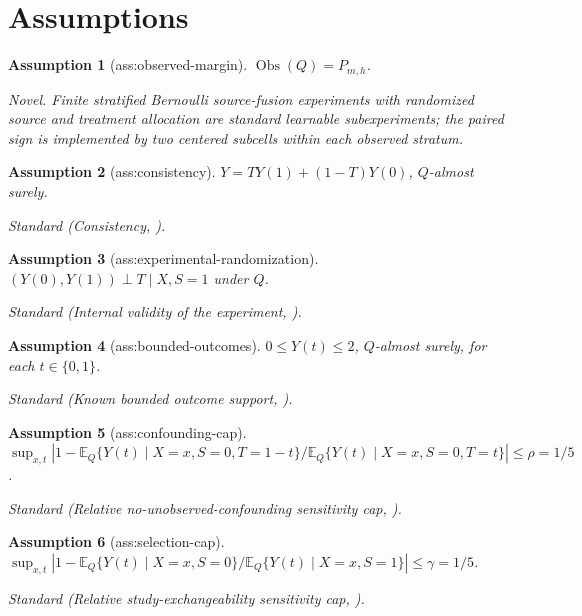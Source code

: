 \documentclass{article}
\newtheorem{assumption}{Assumption}
\begin{document}
\section{Assumptions}

\begin{assumption}[ass:observed-margin]\label{ass:observed-margin}
\(\operatorname{Obs}(Q)=P_{m,h}\).
\par\smallskip\noindent\emph{Novel.} Finite stratified Bernoulli source-fusion experiments with randomized source and treatment allocation are standard learnable subexperiments; the paired sign is implemented by two centered subcells within each observed stratum.
\end{assumption}

\begin{assumption}[ass:consistency]\label{ass:consistency}
\(Y=TY(1)+(1-T)Y(0)\), \(Q\)-almost surely.
\par\smallskip\noindent\emph{Standard} (Consistency, \cite{LannersRudinVolfovskyParikh2025}).
\end{assumption}

\begin{assumption}[ass:experimental-randomization]\label{ass:experimental-randomization}
\((Y(0),Y(1))\perp T\mid X,S=1\) under \(Q\).
\par\smallskip\noindent\emph{Standard} (Internal validity of the experiment, \cite{LannersRudinVolfovskyParikh2025}).
\end{assumption}

\begin{assumption}[ass:bounded-outcomes]\label{ass:bounded-outcomes}
\(0\le Y(t)\le2\), \(Q\)-almost surely, for each \(t\in\{0,1\}\).
\par\smallskip\noindent\emph{Standard} (Known bounded outcome support, \cite{LannersRudinVolfovskyParikh2025}).
\end{assumption}

\begin{assumption}[ass:confounding-cap]\label{ass:confounding-cap}
\(\sup_{x,t}\left|1-\mathbb E_Q\{Y(t)\mid X=x,S=0,T=1-t\}/\mathbb E_Q\{Y(t)\mid X=x,S=0,T=t\}\right|\le\rho=1/5\).
\par\smallskip\noindent\emph{Standard} (Relative no-unobserved-confounding sensitivity cap, \cite{LannersRudinVolfovskyParikh2025}).
\end{assumption}

\begin{assumption}[ass:selection-cap]\label{ass:selection-cap}
\(\sup_{x,t}\left|1-\mathbb E_Q\{Y(t)\mid X=x,S=0\}/\mathbb E_Q\{Y(t)\mid X=x,S=1\}\right|\le\gamma=1/5\).
\par\smallskip\noindent\emph{Standard} (Relative study-exchangeability sensitivity cap, \cite{LannersRudinVolfovskyParikh2025}).
\end{assumption}
\end{document}
